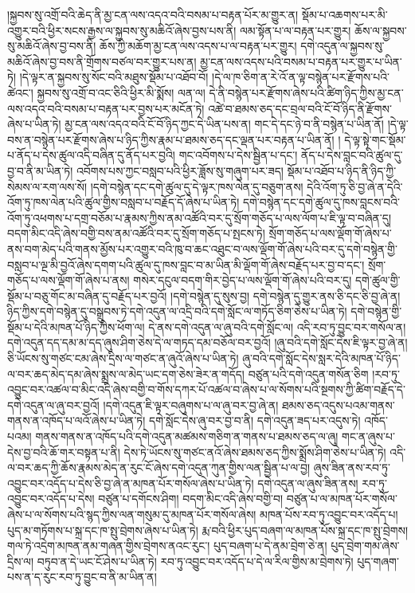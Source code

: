 །སྐྱབས་སུ་འགྲོ་བའི་ཆེད་ནི་མྱ་ངན་ལས་འདའ་བའི་བསམ་པ་བརྟན་པོར་མ་གྱུར་ན། སྡོམ་པ་འཆགས་པར་མི་འགྱུར་བའི་ཕྱིར་སངས་རྒྱས་ལ་སྐྱབས་སུ་མཆིའོ་ཞེས་བྱས་པས་ནི། ལམ་སྟོན་པ་ལ་བརྟན་པར་གྱུར། ཆོས་ལ་སྐྱབས་སུ་མཆིའོ་ཞེས་བྱ་བས་ནི། ཆོས་ཀྱི་མཆོག་མྱ་ངན་ལས་འདས་པ་ལ་བརྟན་པར་གྱུར། དགེ་འདུན་ལ་སྐྱབས་སུ་མཆིའོ་ཞེས་བྱ་བས་ནི་གྲོགས་བཙལ་བར་གྱུར་པས་ན། མྱ་ངན་ལས་འདས་པའི་བསམ་པ་བརྟན་པར་གྱུར་པ་ཡིན་ཏེ། །དེ་ལྟར་ན་སྐྱབས་སུ་སོང་བའི་མཐུས་སྡོམ་པ་འཐོབ་བོ། །དེ་ལ་ཁ་ཅིག་ན་རེ་འོ་ན་ལྟ་བསྙེན་པར་རྫོགས་པའི་ཚེའང་། སྐྱབས་སུ་འགྲོ་བ་འང་ཅིའི་ཕྱིར་མི་སྨོས། ལན་ལ། དེ་ནི་བསྙེན་པར་རྫོགས་ཞེས་པའི་ཚིག་ཉིད་ཀྱིས་མྱ་ངན་ལས་འདའ་བའི་བསམ་པ་བརྟན་པར་བྱས་པར་མངོན་ཏེ། འཚེ་བ་ཐམས་ཅད་དང་བྲལ་བའི་ངོ་བོ་ཉིད་ནི་རྫོགས་ཞེས་པ་ཡིན་ཏེ། མྱ་ངན་ལས་འདའ་བའི་ངོ་བོ་ཉིད་ཀྱང་དེ་ཡིན་པས་ན། གང་དེ་དང་ཉེ་བ་ནི་བསྙེན་པ་ཡིན་ནོ། །དེ་ལྟ་བས་ན་བསྙེན་པར་རྫོགས་ཞེས་པ་ཉིད་ཀྱིས་རྣམ་པ་ཐམས་ཅད་དང་ལྡན་པར་བརྟན་པ་ཡིན་ནོ། །
དེ་ལྟ་སྟེ་གང་སྡོམ་པ་ནོད་པ་དེས་ཚུལ་འདི་བཞིན་དུ་ནོད་པར་བྱའི། གང་འབོགས་པ་དེས་སྦྱིན་པ་དང་། ནོད་པ་དེས་བླང་བའི་ཚུལ་དུ་བྱ་བ་ནི་མ་ཡིན་ཏེ། འབོགས་པས་ཀྱང་བསླབ་པའི་ཕྱིར་ཟློས་སུ་གཞུག་པར་ཟད། སྡོམ་པ་འཐོབ་པ་ཉིད་ནི་ཉིད་ཀྱི་སེམས་ལ་རག་ལས་སོ། །དགེ་བསྙེན་དང་དགེ་ཚུལ་དུ་དེ་ལྟར་ཁས་ལེན་དུ་བཅུག་ནས། དེའི་འོག་ཏུ་ཅི་བྱ་ཞེ་ན་དེའི་འོག་ཏུ་ཁས་ལེན་པའི་ཚུལ་གྱིས་བསླབ་པ་བརྗོད་དོ་ཞེས་པ་ཡིན་ཏེ། དགེ་བསྙེན་དང་དགེ་ཚུལ་དུ་ཁས་བླངས་བའི་འོག་ཏུ་འཕགས་པ་དགྲ་བཅོམ་པ་རྣམས་ཀྱིས་ནམ་འཚོའི་བར་དུ་སྲོག་གཅོད་པ་ལས་ལོག་པ་ཇི་ལྟ་བ་བཞིན་དུ། བདག་མིང་འདི་ཞེས་བགྱི་བས་ནམ་འཚོའི་བར་དུ་སྲོག་གཅོད་པ་སྤངས་ཏེ། སྲོག་གཅོད་པ་ལས་ལྡོག་གོ་ཞེས་པ་ནས་བག་མེད་པའི་གནས་མྱོས་པར་འགྱུར་བའི་ཁུ་བ་ཆང་འཐུང་བ་ལས་ལྡོག་གོ་ཞེས་པའི་བར་དུ་དགེ་བསྙེན་གྱི་བསླབ་པ་ལྔ་མི་བྱའོ་ཞེས་དགག་པའི་ཚུལ་དུ་ཁས་བླང་བ་མ་ཡིན་མི་ལྡོག་གོ་ཞེས་བརྗོད་པར་བྱ་བ་དང་། སྲོག་གཅོད་པ་ལས་ལྡོག་གོ་ཞེས་པ་ནས། གསེར་དངུལ་བདག་གིར་བྱེད་པ་ལས་ལྡོག་གོ་ཞེས་པའི་བར་དུ། དགེ་ཚུལ་གྱི་སྡོམ་པ་བཅུ་གོང་མ་བཞིན་དུ་བརྗོད་པར་བྱའོ། །དགེ་བསྙེན་དུ་སུས་བྱ། དགེ་བསྙེན་དུ་གྱུར་ནས་ཅི་དང་ཅི་བྱ་ཞེ་ན། ཉིད་ཀྱིས་དགེ་བསྙེན་དུ་བསྒྲུབས་ཏེ་དགེ་འདུན་ལ་འདྲི་བའི་དགེ་སློང་ལ་གཏོད་ཅིག་ཅེས་པ་ཡིན་ཏེ། དགེ་བསྙེན་གྱི་སྡོམ་པ་དེའི་མཁན་པོ་ཉིད་ཀྱིས་ཕོག་ལ། དེ་ནས་དགེ་འདུན་ལ་ཞུ་བའི་དགེ་སློང་ལ། འདི་རབ་ཏུ་བྱུང་བར་གསོལ་ན། དགེ་འདུན་དད་དམ་མ་དད་ཞུས་ཤིག་ཅེས་དེ་ལ་གཏད་དམ་བཅོལ་བར་བྱའོ། །ཞུ་བའི་དགེ་སློང་དེས་ཇི་ལྟར་བྱ་ཞེ་ན། ཅི་ཡོངས་སུ་གཙང་ངམ་ཞེས་དྲིས་ལ་གཙང་ན་ཞུའོ་ཞེས་པ་ཡིན་ཏེ། ཞུ་བའི་དགེ་སློང་དེས་སླར་དེའི་མཁན་པོ་ཉིད་ལ་བར་ཆད་མེད་དམ་ཞེས་སྨྲས་ལ་མེད་ཡང་དག་ཅེས་ཟེར་ན་གདོད། བཙུན་པའི་དགེ་འདུན་གསོན་ཅིག །རབ་ཏུ་འབྱུང་བར་འཚལ་བ་མིང་འདི་ཞེས་བགྱི་བ་གོས་དཀར་པོ་འཚལ་བ་ཞེས་པ་ལ་སོགས་པའི་སྔགས་ཀྱི་ཚིག་བརྗོད་དེ་དགེ་འདུན་ལ་ཞུ་བར་བྱའོ། །དགེ་འདུན་ཇི་ལྟར་བཞུགས་པ་ལ་ཞུ་བར་བྱ་ཞེ་ན། ཐམས་ཅད་འདུས་པའམ་གནས་གནས་ན་འཁོད་པ་ལའོ་ཞེས་པ་ཡིན་ཏེ། དགེ་སློང་དེས་ཞུ་བར་བྱ་བ་ནི། དགེ་འདུན་ཟད་པར་འདུས་ཏེ། འཁོད་པའམ། གནས་གནས་ན་འཁོད་པའི་དགེ་འདུན་མཚམས་གཅིག་ན་གནས་པ་ཐམས་ཅད་ལ་ཞུ། གང་ན་ཞུས་པ་དེས་བྱ་བའི་ཆོ་གར་བསྟན་པ་ནི། དེས་ཏེ་ཡོངས་སུ་གཙང་ནའོ་ཞེས་ཐམས་ཅད་ཀྱིས་སྨྲོས་ཤིག་ཅེས་པ་ཡིན་ཏེ། འདི་ལ་བར་ཆད་ཀྱི་ཆོས་རྣམས་མེད་ན་རུང་ངོ་ཞེས་དགེ་འདུན་ཀུན་གྱིས་ལན་སྦྱིན་པ་ལ་བྱ། ཞུས་ཟིན་ནས་རབ་ཏུ་འབྱུང་བར་འདོད་པ་དེས་ཅི་བྱ་ཞེ་ན་མཁན་པོར་གསོལ་ཞེས་པ་ཡིན་ཏེ། དགེ་འདུན་ལ་ཞུས་ཟིན་ནས། རབ་ཏུ་འབྱུང་བར་འདོད་པ་དེས། བཙུན་པ་དགོངས་ཤིག། བདག་མིང་འདི་ཞེས་བགྱི་བ། བཙུན་པ་ལ་མཁན་པོར་གསོལ་ཞེས་པ་ལ་སོགས་པའི་སྙད་ཀྱིས་ལན་གསུམ་དུ་མཁན་པོར་གསོལ་ཞེས། མཁན་པོས་རབ་ཏུ་འབྱུང་བར་འདོད་པ། པུད་མ་གཏོགས་པ་སྐྲ་དང་ཁ་སྤུ་བྲེགས་ཞེས་པ་ཡིན་ཏེ། རྨ་བའི་ཕྱིར་པུད་བཞག་ལ་མཁན་པོས་སྐྲ་དང་ཁ་སྤུ་བྲེགས། གལ་ཏེ་འདྲེག་མཁན་ནམ་གཞན་གྱིས་བྲེགས་ནའང་རུང་། པུད་བཞག་པ་དེ་ནམ་བྲེག་ཅེ་ན། པུད་བྲེག་གམ་ཞེས་དྲིས་ལ། བཏུབ་ན་དེ་ཡང་ངོ་ཤེས་པ་ཡིན་ཏེ། རབ་ཏུ་འབྱུང་བར་འདོད་པ་དེ་ལ་རིལ་གྱིས་མ་བྲེགས་ཏེ། པུད་གཞག་པས་ན་ད་རུང་རབ་ཏུ་བྱུང་བ་ནི་མ་ཡིན་ན། 